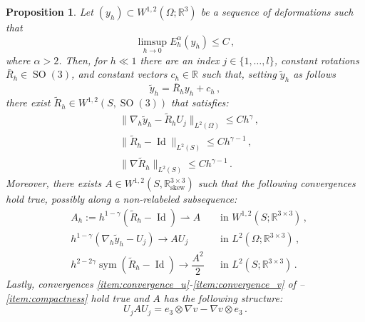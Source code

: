 \documentclass{article}
\theoremstyle{plain}
\theoremstyle{plain}
\theoremstyle{plain}
\theoremstyle{plain}
\theoremstyle{plain}
\newtheorem{prop}[teo]{Proposition}
\theoremstyle{definition}
\theoremstyle{definition}
\renewcommand{\r}{\mathbb{R}}
\newcommand{\todeb}{\rightharpoonup}
\DeclareMathOperator{\Id}{Id}
\DeclareMathOperator{\SO}{SO}
\DeclareMathOperator{\skw}{skew}
\DeclareMathOperator{\sym}{sym}
\begin{document}
\begin{prop}\label{prop:rescaling_convergence}
    Let $(y_h) \subset W^{1,2}(\Omega; \r^3)$ be a sequence of deformations such that
    \[
        \limsup_{h \to 0} E_h^\alpha(y_h) \leq C\,,
    \]
    where $\alpha > 2$. Then, for $h \ll 1$ there are an index $j \in \{1, \dots, l\}$, constant rotations $\bar R_h \in \SO(3)$, and constant vectors $c_h \in \r$ such that, setting $\tilde y_h$ as follows
    \begin{equation}
        \tilde y_h = \bar R_h y_h + c_h \,,
    \end{equation}
    there exist $\tilde R_h \in W^{1,2}(S, \SO(3))$ that satisfies:
    \begin{align}
        & \|\nabla_h \tilde y_h - \tilde R_h U_j\|_{L^2(\Omega)} \leq C h^{\gamma} \label{eq:convergence_rescaled_gradient} \,,\\
        & \|\tilde R_h - \Id\|_{L^2(S)} \leq Ch^{\gamma-1} \label{eq:convergence_approximated_rotation} \,,\\
        & \|\nabla \tilde R_h\|_{L^2(S)} \leq Ch^{\gamma-1} \label{eq:convergence_gradient_approximated_rotation} \,.
    \end{align}
    Moreover, there exists $A \in W^{1,2}(S, \r^{3 \times 3}_{\skw})$ such that the following convergences hold true, possibly along a non-relabeled subsequence:
    \begin{align}
        & A_h := h^{1-\gamma}(\tilde R_h - \Id) \todeb A && \text{in} \, \, W^{1,2}(S; \r^{3 \times 3}) \label{eq:convergence_Ah} \,,\\
        & h^{1-\gamma}(\nabla_h \tilde y_h - U_j) \to AU_j && \text{in} \, \, L^2(\Omega; \r^{3 \times 3}) \label{eq:convergence_rescaled_gradient_U} \,,\\
        & h^{2-2\gamma}\sym(\tilde R_h - \Id) \to \dfrac{A^2}{2} && \text{in} \, \, L^2(S; \r^{3 \times 3}) \label{eq:convergence_symmetric_part}\,.
    \end{align}
   	Lastly, convergences \ref{item:convergence_u}-\ref{item:convergence_v} of --\ref{item:compactness} hold true and $A$ has the following structure:
    \begin{equation}
        U_j A U_j = e_3 \otimes \nabla v - \nabla v \otimes e_3 \label{eq:characterization_A}\,.
    \end{equation}
\end{prop}
\end{document}
